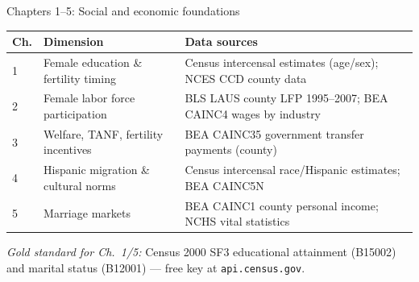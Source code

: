 \documentclass[aspectratio=169,12pt]{beamer}
\begin{document}
\begin{frame}{Chapters 1--5: Social and economic foundations}

\vspace{0.2em}
{\scriptsize\setlength{\tabcolsep}{4pt}%
\begin{tabular}{@{}p{}p{}p{}@{}}
\toprule
\textbf{Ch.} & \textbf{Dimension} & \textbf{Data sources} \\
\midrule
1 & Female education \& fertility timing
  & Census intercensal estimates (age/sex); NCES CCD county data \\[1pt]
2 & Female labor force participation
  & BLS LAUS county LFP 1995--2007; BEA CAINC4 wages by industry \\[1pt]
3 & Welfare, TANF, fertility incentives
  & BEA CAINC35 government transfer payments (county) \\[1pt]
4 & Hispanic migration \& cultural norms
  & Census intercensal race/Hispanic estimates; BEA CAINC5N \\[1pt]
5 & Marriage markets
  & BEA CAINC1 county personal income; NCHS vital statistics \\
\bottomrule
\end{tabular}%
}

\vspace{0.25em}
{\scriptsize\color{OldMortar}
\textit{Gold standard for Ch.\ 1/5:} Census 2000 SF3 educational attainment (B15002)
and marital status (B12001) --- free key at \texttt{api.census.gov}.}

\end{frame}
\end{document}
